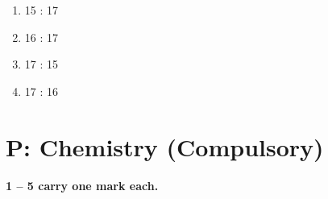 \documentclass[journal,12pt,onecolumn]{IEEEtran}
\begin{document}
\begin{enumerate}[label=\arabic*.]
\begin{multicols}{2}
\begin{enumerate}[label=(\Alph*)]
    \item 15 : 17
    \item 16 : 17
    \item 17 : 15
    \item 17 : 16
\end{enumerate}
\end{multicols}

\end{enumerate}
\newpage
\section*{\centering  P: Chemistry (Compulsory)}

\noindent \textbf{1 -- 5 carry one mark each.}
\end{document}
